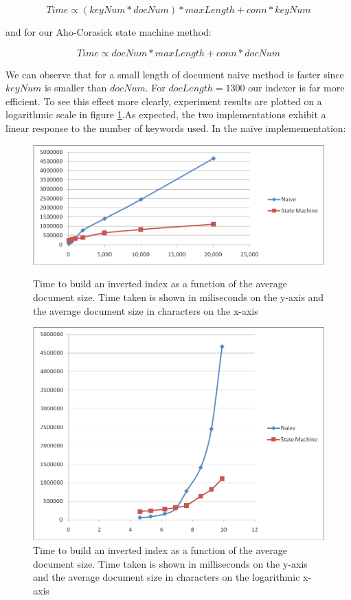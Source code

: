 \documentclass[10pt]{article}
\begin{document}
\[Time \propto (keyNum * docNum) * maxLength + conn * keyNum\]

and for our Aho-Corasick state machine method: 

\[Time \propto docNum * maxLength + conn * docNum\]

We can observe that for a small length of document naive method is
faster since \(keyNum\) is smaller than \(docNum\). For \(docLength = 1300\)
our indexer is far more efficient. To see this effect more clearly,
experiment results are plotted on a logarithmic scale in figure
\ref{fig:naivedocumentsizelog}.As expected, the two implementations
exhibit a linear response to the number of keywords used. In the
na\"{i}ve implemementation:  


\begin{figure}[ht]
  \begin{minipage}[b]{0.5\linewidth}
    \centering
    \includegraphics[width=\textwidth]{naivedocumentsize}
    \caption{Time to build an inverted index as a function of the
      average document size. Time taken is shown in miliseconds on the
      y-axis and the average document size in characters on the x-axis}
    \label{fig:naivedocumentsize}
  \end{minipage}
  \hspace{0.5cm}
  \begin{minipage}[b]{0.5\linewidth}
    \centering
    \includegraphics[width=\textwidth]{naivedocumentsizelog}
    \caption{Time to build an inverted index as a function of the
      average document size. Time taken is shown in milliseconds on the
      y-axis and the average document size in characters on the
      logarithmic x-axis}
    \label{fig:naivedocumentsizelog}
  \end{minipage}
\end{figure}
\end{document}
